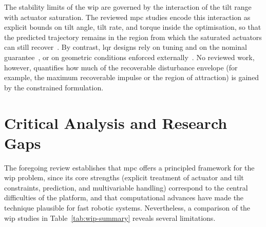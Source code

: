 The stability limits of the \ac{wip} are governed by the interaction of the tilt range with actuator saturation. The reviewed \ac{mpc} studies encode this interaction as explicit bounds on tilt angle, tilt rate, and torque inside the optimisation, so that the predicted trajectory remains in the region from which the saturated actuators can still recover~\cite{yue2018tsmc,yue2018ijcas}. By contrast, \ac{lqr} designs rely on tuning and on the nominal guarantee~\cite{klemm2019}, or on geometric conditions enforced externally~\cite{zhang2022}. No reviewed work, however, quantifies how much of the recoverable disturbance envelope (for example, the maximum recoverable impulse or the region of attraction) is gained by the constrained formulation.

\section{Critical Analysis and Research Gaps}\label{sec:bg-gaps}

The foregoing review establishes that \ac{mpc} offers a principled framework for the \ac{wip} problem, since its core strengths (explicit treatment of actuator and tilt constraints, prediction, and multivariable handling) correspond to the central difficulties of the platform, and that computational advances have made the technique plausible for fast robotic systems. Nevertheless, a comparison of the \ac{wip} studies in Table~\ref{tab:wip-summary} reveals several limitations.

